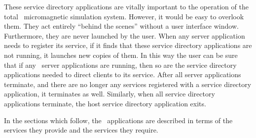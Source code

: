 These service directory applications are vitally important to the
operation of the total \OOMMF\ micromagnetic simulation system.
However, it would be easy to overlook them.  They act entirely ``behind
the scenes'' without a user interface window.  Furthermore, they are
never launched by the user.  When any server application needs to
register its service, if it finds that these service directory
applications are not running, it launches new copies of them.  In this
way the user can be sure that if any \OOMMF\ server applications are
running, then so are the service directory applications needed to direct
clients to its service.  After all server applications terminate, and
there are no longer any services registered with a service directory
application, it terminates as well.  Similarly, when all service
directory applications terminate, the host service directory application
exits.

In the sections which follow, the \OOMMF\ applications are
described in terms of the services they provide and the services
they require.  


